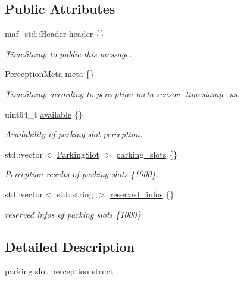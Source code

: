 \subsection*{Public Attributes}
\begin{DoxyCompactItemize}
\item 
maf\+\_\+std\+::\+Header \hyperlink{structmaf__perception__interface_1_1ParkingSlotPerception_a6c5ea2fea944d3f9612868091f48e735}{header} \{\}
\begin{DoxyCompactList}\small\item\em Time\+Stamp to public this message. \end{DoxyCompactList}\item 
\hyperlink{structmaf__perception__interface_1_1PerceptionMeta}{Perception\+Meta} \hyperlink{structmaf__perception__interface_1_1ParkingSlotPerception_ab1014a93d374c093b9e9bbc070f92289}{meta} \{\}
\begin{DoxyCompactList}\small\item\em Time\+Stamp according to perception meta.\+sensor\+\_\+timestamp\+\_\+us. \end{DoxyCompactList}\item 
uint64\+\_\+t \hyperlink{structmaf__perception__interface_1_1ParkingSlotPerception_abe8c2d9f5acfbf5969a96b89ef84b7ff}{available} \{\}
\begin{DoxyCompactList}\small\item\em Availability of parking slot perception. \end{DoxyCompactList}\item 
std\+::vector$<$ \hyperlink{structmaf__perception__interface_1_1ParkingSlot}{Parking\+Slot} $>$ \hyperlink{structmaf__perception__interface_1_1ParkingSlotPerception_ac46ca94e9227689117db96ab16029387}{parking\+\_\+slots} \{\}
\begin{DoxyCompactList}\small\item\em Perception results of parking slots \{1000\}. \end{DoxyCompactList}\item 
std\+::vector$<$ std\+::string $>$ \hyperlink{structmaf__perception__interface_1_1ParkingSlotPerception_a9018d6d208bf8a0d43db6ec2c17c4314}{reserved\+\_\+infos} \{\}
\begin{DoxyCompactList}\small\item\em reserved infos of parking slots \{1000\} \end{DoxyCompactList}\end{DoxyCompactItemize}


\subsection{Detailed Description}
parking slot perception struct 

